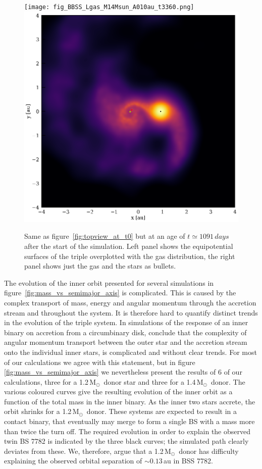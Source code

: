 \documentclass[twocolumn]{aastex62}
\newcommand{\MSun}{\mbox{M$_\odot$}}
\begin{document}
\begin{figure}[ht!]
  \texttt{[image: fig\_BBSS\_Lgas\_M14Msun\_A010au\_t3360.png]}
~  \includegraphics[width=0.5\linewidth]{fig_BBSS_gas_M14Msun_A010au_t3360.png}
\caption{Same as figure~\ref{fig:topview_at_t0} but at an age of $t
  \simeq 1091\,days$ after the start of the simulation. Left panel
  shows the equipotential surfaces of the triple overplotted with the
  gas distribution, the right panel shows just the gas and the stars
  as bullets.
\label{fig:topview_at_t1000day}}
\end{figure}

The evolution of the inner orbit presented for several simulations in
figure~\ref{fig:mass_vs_semimajor_axis} is complicated.  This is
caused by the complex transport of mass, energy and angular momentum
through the accretion stream and throughout the system.  It is
therefore hard to quantify distinct trends in the evolution of the
triple system. In simulations of the response of an inner binary on
accretion from a circumbinary disk, \cite{2018arXiv181208175M}
conclude that the complexity of angular momentum transport between the
outer star and the accretion stream onto the individual inner stars,
is complicated and without clear trends. For most of our calculations
we agree with this statement, but in
figure~\,\ref{fig:mass_vs_semimajor_axis} we nevertheless present the
results of 6 of our calculations, three for a 1.2\,\MSun\, donor star
and three for a 1.4\,\MSun\, donor. The various coloured curves give
the resulting evolution of the inner orbit as a function of the total
mass in the inner binary. As the inner two stars accrete, the orbit
shrinks for a 1.2\,\MSun\, donor. These systems are expected to result
in a contact binary, that eventually may merge to form a single BS
with a mass more than twice the turn off. The required evolution in
order to explain the observed twin BS 7782 is indicated by the three
black curves; the simulated path clearly deviates from these. We,
therefore, argue that a 1.2\,\MSun\, donor has difficulty explaining
the observed orbital separation of $\sim 0.13$\,au in BSS 7782.
\end{document}
